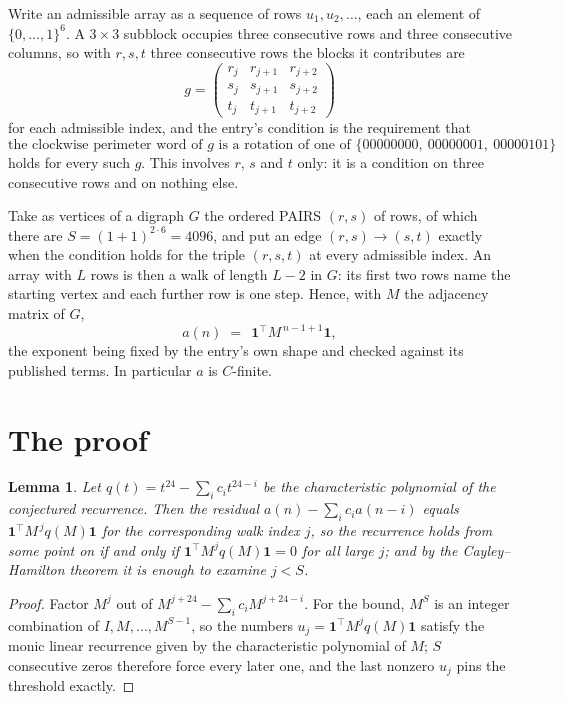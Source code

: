 \documentclass[11pt,a4paper]{article}
\theoremstyle{plain}
\newtheorem{lemma}[theorem]{Lemma}
\theoremstyle{definition}
\begin{document}
Write an admissible array as a sequence of rows $u_1,u_2,\dots$, each an element of
$\{0,\dots,1\}^{6}$. A $3\times3$ subblock occupies three consecutive rows and
three consecutive columns, so with $r,s,t$ three consecutive rows the blocks it
contributes are
\[
g=\begin{pmatrix}r_j&r_{j+1}&r_{j+2}\\ s_j&s_{j+1}&s_{j+2}\\ t_j&t_{j+1}&t_{j+2}\end{pmatrix}
\]
for each admissible index, and the entry's condition is the requirement that
\[
\text{the clockwise perimeter word of }g\text{ is a rotation of one of }\{00000000,\ 00000001,\ 00000101\}
\]
holds for every such $g$. This involves $r$, $s$ and $t$ only: it is a condition on
three consecutive rows and on nothing else.

Take as vertices of a digraph $G$ the ordered PAIRS $(r,s)$ of rows, of which there are
$S=(1+1)^{2\cdot6}=4096$, and put an edge $(r,s)\to(s,t)$ exactly when the condition
holds for the triple $(r,s,t)$ at every admissible index. An array with $L$ rows is then a
walk of length $L-2$ in $G$: its first two rows name the starting vertex and each further
row is one step. Hence, with $M$ the adjacency matrix of $G$,
\[
a(n)\;=\;\,\mathbf{1}^{\!\top}M^{\,n-1+1}\mathbf{1},
\]
the exponent being fixed by the entry's own shape and checked against its published terms.
In particular $a$ is $C$-finite.

\section{The proof}

\begin{lemma}\label{lem:crit}
Let $q(t)=t^{24}-\sum_i c_it^{24-i}$ be the characteristic polynomial of the
conjectured recurrence. Then the residual $a(n)-\sum_ic_ia(n-i)$ equals
$\mathbf{1}^{\!\top}M^{\,j}q(M)\mathbf{1}$ for the corresponding walk index
$j$, so the recurrence holds from some point on if and only if
$\mathbf{1}^{\!\top}M^{j}q(M)\mathbf{1}=0$ for all large $j$; and by the
Cayley--Hamilton theorem it is enough to examine $j<S$.
\end{lemma}

\begin{proof}
Factor $M^{j}$ out of $M^{j+24}-\sum_ic_iM^{j+24-i}$. For the bound, $M^{S}$
is an integer combination of $I,M,\dots,M^{S-1}$, so the numbers
$u_j=\mathbf{1}^{\!\top}M^{j}q(M)\mathbf{1}$ satisfy the monic linear recurrence given by
the characteristic polynomial of $M$; $S$ consecutive zeros therefore force every later one,
and the last nonzero $u_j$ pins the threshold exactly.
\end{proof}
\end{document}
